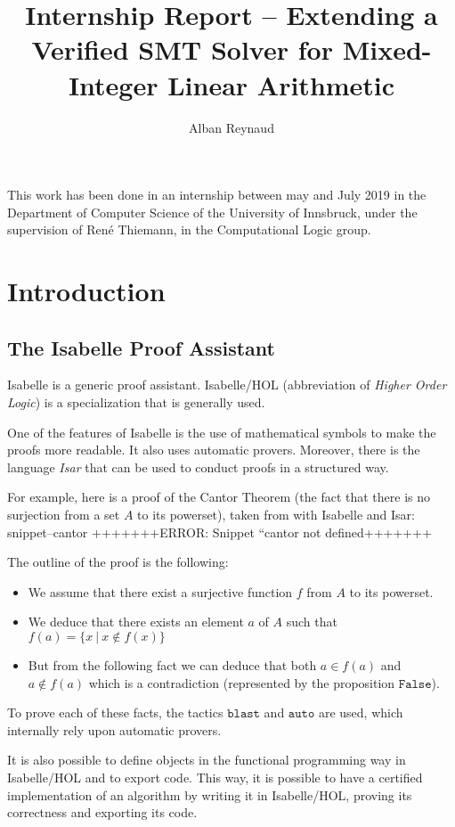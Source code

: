 \documentclass{article}
\title{Internship Report -- Extending a Verified SMT Solver for Mixed-Integer
Linear Arithmetic}
\author{Alban Reynaud}
\date{}
\newcommand{\Snippet}[1]{%
  \ifcsname snippet--#1\endcsname{\csname snippet--#1\endcsname}%
  \else+++++++ERROR: Snippet ``#1 not defined+++++++ \fi}
\begin{document}
\maketitle

This work has been done in an internship between may and July 2019
in the Department of Computer Science
of the University of Innsbruck, under the supervision of René Thiemann, in the
Computational Logic group.

\tableofcontents

\section{Introduction}
\subsection{The Isabelle Proof Assistant}
Isabelle \cite{Isabelle} is a generic proof assistant. Isabelle/HOL
(abbreviation of \textit{Higher Order Logic}) is a specialization that is
generally used.

One of the features of Isabelle is the use of mathematical symbols to make the
proofs more readable. It also uses automatic provers.
Moreover, there is the language \textit{Isar} that can be used to conduct proofs
in a structured way.

For example, here is a proof of the Cantor Theorem (the fact that there is no
surjection from a set $A$ to its powerset), taken from
\cite[Section 5.1]{ConcreteSemantics}
with Isabelle and Isar:
\Snippet{cantor}

The outline of the proof is the following:
\begin{itemize}
  \item We assume that there exist a surjective function $f$ from $A$ to
    its powerset.
  \item We deduce that there exists an element $a$ of $A$ such that
    $f(a) = \{x~|~x \notin f(x)\}$
  \item But from the following fact we can deduce that both $a \in f(a)$ and $a
    \notin f(a)$ which is a contradiction (represented by the proposition
    $\mathtt{False}$).
\end{itemize}
To prove each of these facts, the tactics $\mathtt{blast}$ and
$\mathtt{auto}$ are used, which internally rely upon automatic provers.

It is also possible to define objects in the functional programming way in
Isabelle/HOL and to export code. This way, it is possible to have a certified
implementation of an algorithm by writing it in Isabelle/HOL, proving its
correctness and exporting its code.
\end{document}
